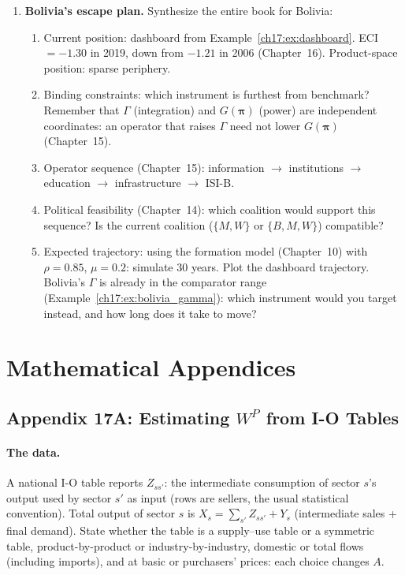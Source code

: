 \documentclass[../structural_economics_book.tex]{subfiles}
\begin{document}
\begin{enumerate}[label=\textbf{17.\arabic*}, leftmargin=3em]
\item \textbf{Bolivia's escape plan.} Synthesize the entire book for Bolivia:
\begin{enumerate}
\item Current position: dashboard from Example~\ref{ch17:ex:dashboard}. ECI $= -1.30$ in 2019, down from $-1.21$ in 2006 (Chapter~16). Product-space position: sparse periphery.
\item Binding constraints: which instrument is furthest from benchmark? Remember that $\Gamma$ (integration) and $G(\boldsymbol{\pi})$ (power) are independent coordinates: an operator that raises $\Gamma$ need not lower $G(\boldsymbol{\pi})$ (Chapter~15).
\item Operator sequence (Chapter~15): information $\to$ institutions $\to$ education $\to$ infrastructure $\to$ ISI-B.
\item Political feasibility (Chapter~14): which coalition would support this sequence? Is the current coalition ($\{M, W\}$ or $\{B, M, W\}$) compatible?
\item Expected trajectory: using the formation model (Chapter~10) with $\rho = 0.85$, $\mu = 0.2$: simulate 30 years. Plot the dashboard trajectory. Bolivia's $\Gamma$ is already in the comparator range (Example~\ref{ch17:ex:bolivia_gamma}): which instrument would you target instead, and how long does it take to move?
\end{enumerate}
\end{enumerate}


\newpage
\section*{Mathematical Appendices}


\subsection*{Appendix 17A: Estimating $W^P$ from I-O Tables}
\label{ch17:app:estimation}

\paragraph{The data.} A national I-O table reports $Z_{ss'}$: the intermediate consumption of sector $s$'s output used by sector $s'$ as input (rows are sellers, the usual statistical convention). Total output of sector $s$ is $X_s = \sum_{s'} Z_{ss'} + Y_s$ (intermediate sales + final demand). State whether the table is a supply--use table or a symmetric table, product-by-product or industry-by-industry, domestic or total flows (including imports), and at basic or purchasers' prices: each choice changes $A$.
\end{document}
